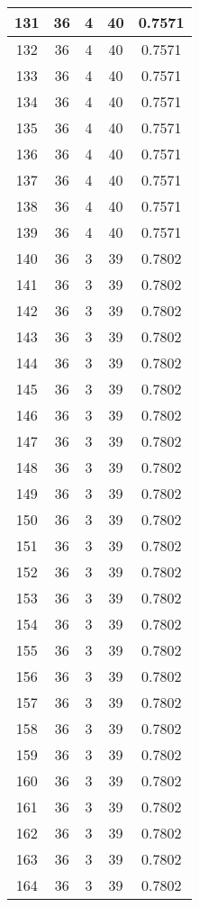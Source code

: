 \documentclass[letterpaper, 12pt]{article}
\begin{document}
\begin{longtable}{|c|c|c|c|c|}
\hline
131 & 36 & 4 & 40 & 0.7571 \\
\hline
132 & 36 & 4 & 40 & 0.7571 \\
\hline
133 & 36 & 4 & 40 & 0.7571 \\
\hline
134 & 36 & 4 & 40 & 0.7571 \\
\hline
135 & 36 & 4 & 40 & 0.7571 \\
\hline
136 & 36 & 4 & 40 & 0.7571 \\
\hline
137 & 36 & 4 & 40 & 0.7571 \\
\hline
138 & 36 & 4 & 40 & 0.7571 \\
\hline
139 & 36 & 4 & 40 & 0.7571 \\
\hline
140 & 36 & 3 & 39 & 0.7802 \\
\hline
141 & 36 & 3 & 39 & 0.7802 \\
\hline
142 & 36 & 3 & 39 & 0.7802 \\
\hline
143 & 36 & 3 & 39 & 0.7802 \\
\hline
144 & 36 & 3 & 39 & 0.7802 \\
\hline
145 & 36 & 3 & 39 & 0.7802 \\
\hline
146 & 36 & 3 & 39 & 0.7802 \\
\hline
147 & 36 & 3 & 39 & 0.7802 \\
\hline
148 & 36 & 3 & 39 & 0.7802 \\
\hline
149 & 36 & 3 & 39 & 0.7802 \\
\hline
150 & 36 & 3 & 39 & 0.7802 \\
\hline
151 & 36 & 3 & 39 & 0.7802 \\
\hline
152 & 36 & 3 & 39 & 0.7802 \\
\hline
153 & 36 & 3 & 39 & 0.7802 \\
\hline
154 & 36 & 3 & 39 & 0.7802 \\
\hline
155 & 36 & 3 & 39 & 0.7802 \\
\hline
156 & 36 & 3 & 39 & 0.7802 \\
\hline
157 & 36 & 3 & 39 & 0.7802 \\
\hline
158 & 36 & 3 & 39 & 0.7802 \\
\hline
159 & 36 & 3 & 39 & 0.7802 \\
\hline
160 & 36 & 3 & 39 & 0.7802 \\
\hline
161 & 36 & 3 & 39 & 0.7802 \\
\hline
162 & 36 & 3 & 39 & 0.7802 \\
\hline
163 & 36 & 3 & 39 & 0.7802 \\
\hline
164 & 36 & 3 & 39 & 0.7802 \\

\end{longtable}
\end{document}
